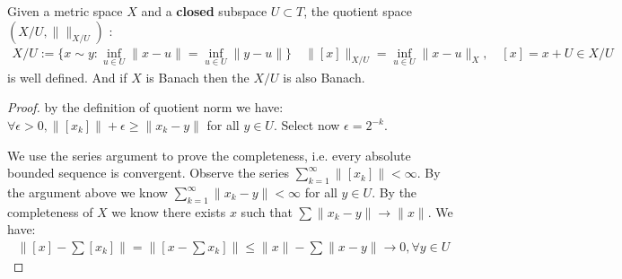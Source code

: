\begin{theorem}
	Given a metric space $X$ and a \textbf{closed} subspace $U \subset T$, the quotient space $(X\slash U, \|\|_{X\slash U})$ :
	\begin{align*}
		X\slash U:= \{ x \sim y : \inf_{u \in U} \|x - u\| = \inf_{u \in U} \|y - u\| \}\quad 
		\|[x]\|_{X\slash U } = \inf_{u \in U}\|x - u\|_X, \quad
		[x] = x + U \in X\slash U
	\end{align*}
	is well defined. And if $X$ is Banach then the $X\slash U$ is also Banach.
\end{theorem}
\begin{proof}
	by the definition of quotient norm we have: $\forall \epsilon >0, \|[x_k]\| + \epsilon  \ge \|x_k - y\|$ for all $y \in U$. Select now $\epsilon = 2^{-k}$.\par 
	We use the series argument to prove the completeness, i.e. every absolute bounded sequence is convergent. Observe the series $\sum_{k = 1}^\infty \|[x_k]\| < \infty$. By the argument above we know $\sum_{k = 1}^\infty \|x_k - y\| < \infty$ for all $y \in U$. By the completeness of $X$ we know there exists $x$ such that $ \sum \|x_k - y\| \rightarrow \|x\|$. We have:
	\begin{align*}
		\|[x] - \sum [x_k]\| = \|[x - \sum x_k]\| \le \|x\| -  \sum\|x - y\| \rightarrow 0, \forall y \in U
	\end{align*}
\end{proof}



